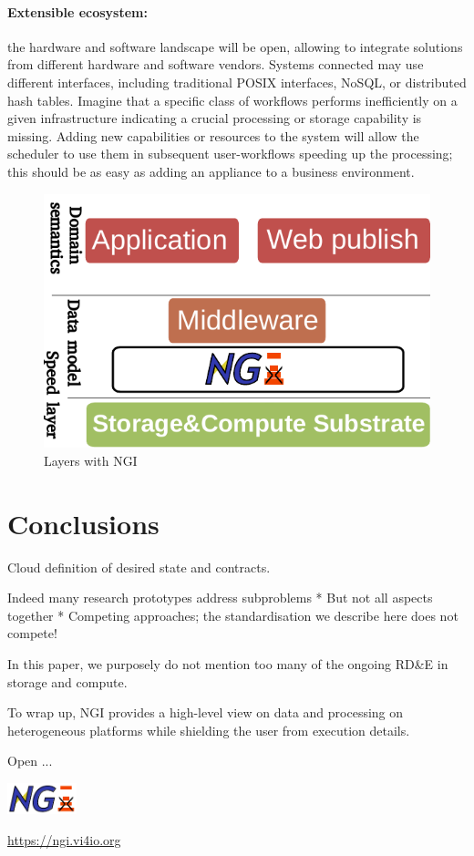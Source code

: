 \documentclass[a4paper, twocolumn]{article}
\begin{document}
\paragraph{Extensible ecosystem:}
the hardware and software landscape will be open, allowing to integrate solutions from different hardware and software vendors.
Systems connected may use different interfaces, including traditional POSIX interfaces, NoSQL, or distributed hash tables.
Imagine that a specific class of workflows performs inefficiently on a given infrastructure indicating a crucial processing or storage capability is missing.
Adding new capabilities or resources to the system will allow the scheduler to use them in subsequent user-workflows speeding up the processing; this should be as easy as adding an appliance to a business environment.



\begin{figure}[b]
  \centering
  \includegraphics[width=0.75\columnwidth]{layers-ngi}
  \caption{Layers with NGI}
  \label{fig:ngilayers}
\end{figure}



\section{Conclusions}
\label{sec:conclusions}


Cloud definition of desired state and contracts.

Indeed many research prototypes address subproblems
* But not all aspects together
* Competing approaches; the standardisation we describe here does not compete!

In this paper, we purposely do not mention too many of the ongoing RD\&E in storage and compute.




To wrap up, NGI provides a high-level view on data and processing on heterogeneous platforms while shielding the user from execution details.

Open ...

\includegraphics[width=2cm]{ngi-logo}

\noindent\url{https://ngi.vi4io.org}
\end{document}
